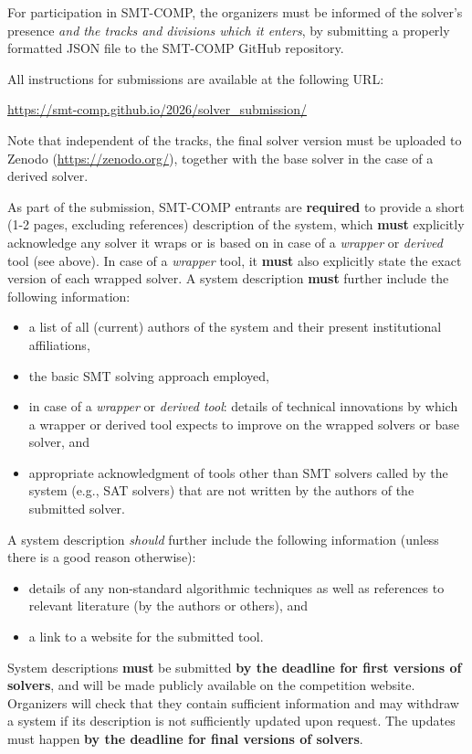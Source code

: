 \documentclass[12pt]{article}
\begin{document}
%
For participation in SMT-COMP, the organizers must be informed of the solver's presence
\emph{and the tracks and divisions which it enters}, by submitting a properly formatted
JSON file to the SMT-COMP GitHub repository.

All instructions for submissions are available at the following URL:
\begin{center}
  \url{https://smt-comp.github.io/2026/solver_submission/}
\end{center}

Note that independent of the tracks, the final solver version must be uploaded
to Zenodo (\url{https://zenodo.org/}), together with the base solver in the case of a
derived solver.

%
As part of the submission, SMT-COMP entrants are \textbf{required} to provide a
short (1-2 pages, excluding references) description of the system, which \textbf{must} explicitly
acknowledge any solver it wraps or is based on in case of a \emph{wrapper} or
\emph{derived} tool (see above).
In case of a \emph{wrapper} tool, it \textbf{must} also explicitly state
the exact version of each wrapped solver.
A system description \textbf{must} further include the following information:
\begin{itemize}[itemsep=0ex]
  \item a list of all (current) authors of the system and their present institutional
    affiliations,
  \item the basic SMT solving approach employed,
  \item in case of a \emph{wrapper} or \emph{derived tool}: details of
    technical innovations by which a wrapper or derived tool expects to improve
    on the wrapped solvers or base solver, and
  \item appropriate acknowledgment of tools other than SMT solvers called by
    the system (e.g., SAT solvers) that are not written by the authors of the
    submitted solver.
\end{itemize}
A system description \emph{should} further include the following information
(unless there is a good reason otherwise):
\begin{itemize}[itemsep=0ex]
  \item details of any non-standard algorithmic techniques as well as
    references to relevant literature (by the authors or others), and
  \item a link to a website for the submitted tool.
\end{itemize}
System descriptions \textbf{must} be submitted \textbf{by the deadline for first versions
of solvers}, and will be made publicly available on the competition website.
Organizers will check that they contain sufficient information
and may withdraw a system if its description is not sufficiently updated upon
request. The updates must happen \textbf{by the deadline for final versions of solvers}.
\end{document}
